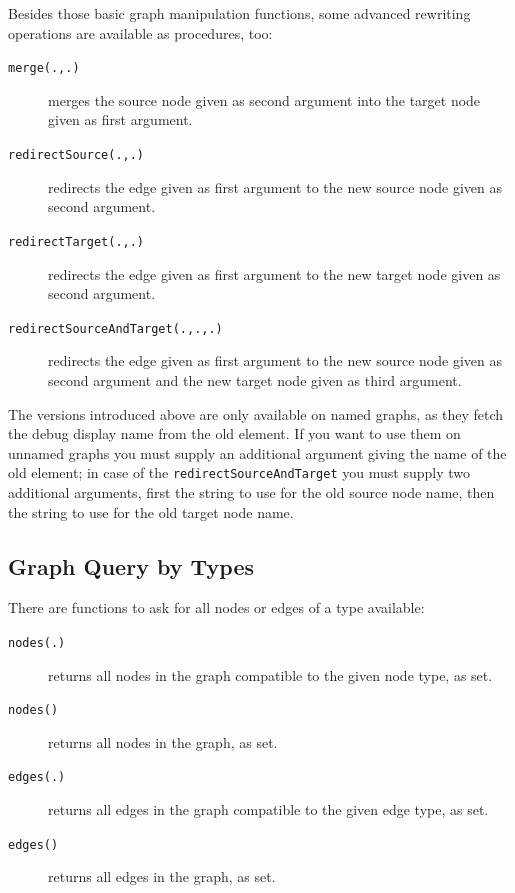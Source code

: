 \noindent Besides those basic graph manipulation functions, some advanced rewriting operations are available as procedures, too:

\begin{description}
\item[\texttt{merge(.,.)}] merges the source node given as second argument into the target node given as first argument.
\item[\texttt{redirectSource(.,.)}] redirects the edge given as first argument to the new source node given as second argument.
\item[\texttt{redirectTarget(.,.)}] redirects the edge given as first argument to the new target node given as second argument.
\item[\texttt{redirectSourceAndTarget(.,.,.)}] redirects the edge given as first argument to the new source node given as second argument and the new target node given as third argument.
\end{description}

The versions introduced above are only available on named graphs, as they fetch the debug display name from the old element.
If you want to use them on unnamed graphs you must supply an additional argument giving the name of the old element; in case of the \texttt{redirectSourceAndTarget} you must supply two additional arguments, first the string to use for the old source node name, then the string to use for the old target node name.

\subsection{Graph Query by Types}

There are functions to ask for all nodes or edges of a type available: 
\begin{description}
\item[\texttt{nodes(.)}] returns all nodes in the graph compatible to the given node type, as set.
\item[\texttt{nodes()}] returns all nodes in the graph, as set.
\item[\texttt{edges(.)}] returns all edges in the graph compatible to the given edge type, as set.
\item[\texttt{edges()}] returns all edges in the graph, as set.
\end{description}


